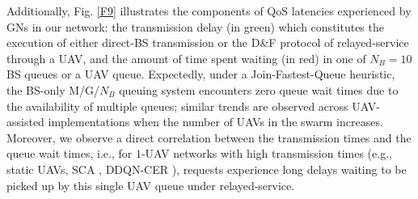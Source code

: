 \documentclass[12pt, draftcls, onecolumn]{IEEEtran}
\theoremstyle{plain}
\theoremstyle{definition}
\theoremstyle{remark}
\begin{document}
Additionally, Fig. \ref{F9} illustrates the components of QoS latencies experienced by GNs in our network: the transmission delay (in green) which constitutes the execution of either direct-BS transmission or the D\&F protocol of relayed-service through a UAV, and the amount of time spent waiting (in red) in one of $N_{B}{=}10$ BS queues or a UAV queue. Expectedly, under a Join-Fastest-Queue heuristic, the BS-only M/G/$N_{B}$ queuing system encounters zero queue wait times due to the availability of multiple queues; similar trends are observed across UAV-assisted implementations when the number of UAVs in the swarm increases. Moreover, we observe a direct correlation between the transmission times and the queue wait times, i.e., for $1$-UAV networks with high transmission times (e.g., static UAVs, SCA \cite{SCA}, DDQN-CER \cite{DDQN}), requests experience long delays waiting to be picked up by this single UAV queue under relayed-service. 
\end{document}
